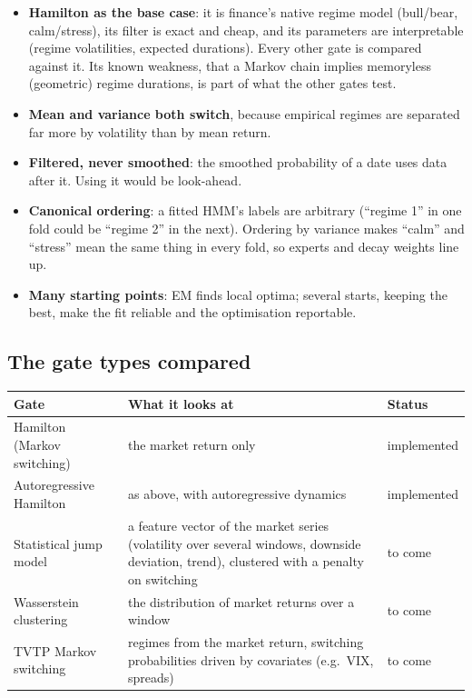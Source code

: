 \begin{whybox}
\begin{itemize}
\item \textbf{Hamilton as the base case}: it is finance's native regime model (bull/bear, calm/stress), its
  filter is exact and cheap, and its parameters are interpretable (regime volatilities, expected
  durations). Every other gate is compared against it. Its known weakness, that a Markov chain implies
  memoryless (geometric) regime durations, is part of what the other gates test.
\item \textbf{Mean and variance both switch}, because empirical regimes are separated far more by volatility than
  by mean return.
\item \textbf{Filtered, never smoothed}: the smoothed probability of a date uses data after it. Using it would be
  look-ahead.
\item \textbf{Canonical ordering}: a fitted HMM's labels are arbitrary (``regime 1'' in one fold could be
  ``regime 2'' in the next). Ordering by variance makes ``calm'' and ``stress'' mean the same thing in every
  fold, so experts and decay weights line up.
\item \textbf{Many starting points}: EM finds local optima; several starts, keeping the best, make the fit
  reliable and the optimisation reportable.
\end{itemize}
\end{whybox}

\subsection{The gate types compared}

\begin{tabularx}{\textwidth}{@{}l X l@{}}
\toprule
Gate & What it looks at & Status\\
\midrule
Hamilton (Markov switching) & the market return only & implemented\\
Autoregressive Hamilton & as above, with autoregressive dynamics & implemented\\
Statistical jump model & a feature vector of the market series (volatility over several windows,
downside deviation, trend), clustered with a penalty on switching & to come\\
Wasserstein clustering & the distribution of market returns over a window & to come\\
TVTP Markov switching & regimes from the market return, switching probabilities driven by covariates
(e.g.\ VIX, spreads) & to come\\
\bottomrule
\end{tabularx}

